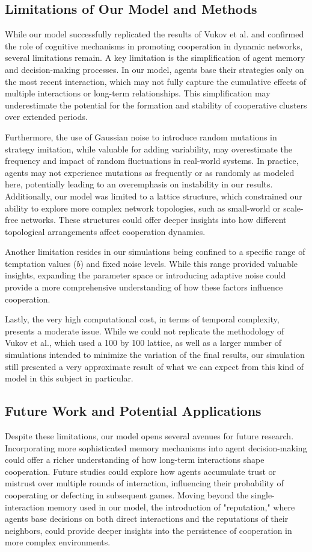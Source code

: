 \documentclass[runningheads]{llncs}
\begin{document}
\subsection{Limitations of Our Model and Methods}
While our model successfully replicated the results of Vukov et al. \cite{vukov}
and confirmed the role of cognitive mechanisms in promoting cooperation in
dynamic networks, several limitations remain. A key limitation is the
simplification of agent memory and decision-making processes. In our model,
agents base their strategies only on the most recent interaction, which may not
fully capture the cumulative effects of multiple interactions or long-term
relationships. This simplification may underestimate the potential for the formation
and stability of cooperative clusters over extended periods.

Furthermore, the use of Gaussian noise to introduce random mutations in strategy imitation, while valuable for adding variability, may overestimate the frequency and impact of random fluctuations in real-world systems. In practice, agents may not experience mutations as frequently or as randomly as modeled here, potentially leading to an overemphasis on instability in our results. Additionally, our model was limited to a lattice structure, which constrained our ability to explore more complex network topologies, such as small-world or scale-free networks. These structures could offer deeper insights into how different topological arrangements affect cooperation dynamics.

Another limitation resides in our simulations being confined to a specific range of temptation values (\( b \)) and fixed noise levels. While this range provided valuable insights, expanding the parameter space or introducing adaptive noise could provide a more comprehensive understanding of how these factors influence cooperation.

Lastly, the very high computational cost, in terms of temporal complexity, presents
a moderate issue. While we could not replicate the methodology of Vukov et al.,
which used a 100 by 100 lattice, as well as a larger number of simulations intended
to minimize the variation of the final results, our simulation still presented
a very approximate result of what we can expect from this kind of model in this
subject in particular.

\subsection{Future Work and Potential Applications}
Despite these limitations, our model opens several avenues for future research. Incorporating more sophisticated memory mechanisms into agent decision-making could offer a richer understanding of how long-term interactions shape cooperation. Future studies could explore how agents accumulate trust or mistrust over multiple rounds of interaction, influencing their probability of cooperating or defecting in subsequent games. Moving beyond the single-interaction memory used in our model, the introduction of "reputation," where agents base decisions on both direct interactions and the reputations of their neighbors, could provide deeper insights into the persistence of cooperation in more complex environments.
\end{document}
